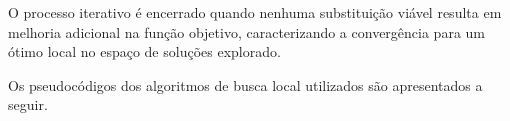 O processo iterativo é encerrado quando nenhuma substituição viável resulta em melhoria adicional na função objetivo, caracterizando a 
convergência para um ótimo local no espaço de soluções explorado.

Os pseudocódigos dos algoritmos de busca local utilizados são apresentados a seguir.




